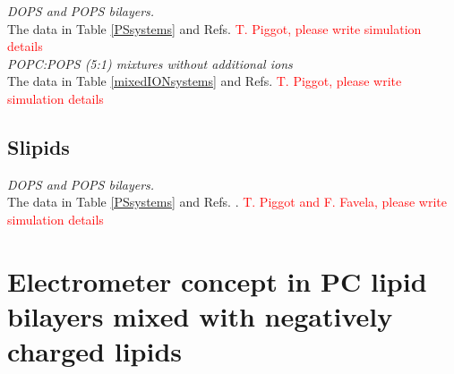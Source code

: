 \documentclass[journal=jpcbfk]{achemso}
\newcommand{\todo}[1]{\textcolor{red}{#1}}
\begin{document}
\noindent
{\it DOPS and POPS bilayers.} \\
The data in Table \ref{PSsystems} and Refs. 
\todo{T. Piggot, please write simulation details} \\

\noindent
    {\it POPC:POPS (5:1) mixtures without additional ions}\\
    The data in Table \ref{mixedIONsystems} and Refs. 
\todo{T. Piggot, please write simulation details} \\

\subsection{Slipids}

\noindent
{\it DOPS and POPS bilayers.} \\
The data in Table \ref{PSsystems} and Refs. .
\todo{T. Piggot and F. Favela, please write simulation details} \\




\section{Electrometer concept in PC lipid bilayers mixed with negatively charged lipids}\label{electrometerFORmixtures}
\end{document}

